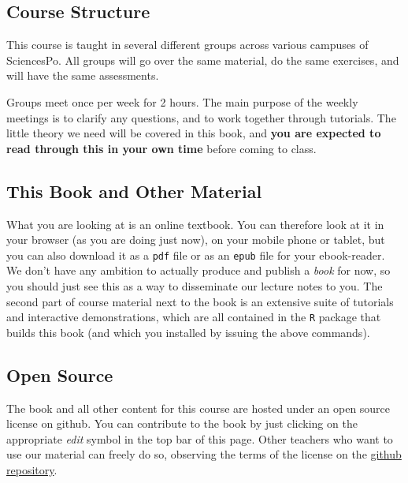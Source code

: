 \documentclass[]{book}
\begin{document}
\subsection*{Course Structure}\label{course-structure}

This course is taught in several different groups across various
campuses of SciencesPo. All groups will go over the same material, do
the same exercises, and will have the same assessments.

Groups meet once per week for 2 hours. The main purpose of the weekly
meetings is to clarify any questions, and to work together through
tutorials. The little theory we need will be covered in this book, and
\textbf{you are expected to read through this in your own time} before
coming to class.

\subsection*{This Book and Other
Material}\label{this-book-and-other-material}

What you are looking at is an online textbook. You can therefore look at
it in your browser (as you are doing just now), on your mobile phone or
tablet, but you can also download it as a \texttt{pdf} file or as an
\texttt{epub} file for your ebook-reader. We don't have any ambition to
actually produce and publish a \emph{book} for now, so you should just
see this as a way to disseminate our lecture notes to you. The second
part of course material next to the book is an extensive suite of
tutorials and interactive demonstrations, which are all contained in the
\texttt{R} package that builds this book (and which you installed by
issuing the above commands).

\subsection*{Open Source}\label{open-source}

The book and all other content for this course are hosted under an open
source license on github. You can contribute to the book by just
clicking on the appropriate \emph{edit} symbol in the top bar of this
page. Other teachers who want to use our material can freely do so,
observing the terms of the license on the
\href{https://github.com/ScPoEcon/ScPoEconometrics}{github repository}.
\end{document}
